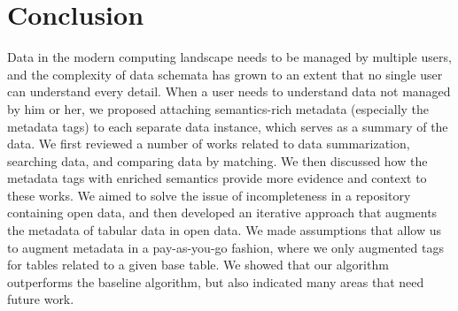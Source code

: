 
\chapter{Conclusion}
\label{ch:Conclusion}

Data in the modern computing landscape needs to be managed by multiple users, and the complexity of data schemata has grown to an extent that no single user can understand every detail. When a user needs to understand data not managed by him or her, we proposed attaching semantics-rich metadata (especially the metadata tags) to each separate data instance, which serves as a summary of the data. We first reviewed a number of works related to data summarization, searching data, and comparing data by matching. We then discussed how the metadata tags with enriched semantics provide more evidence and context to these works. We aimed to solve the issue of incompleteness in a repository containing open data, and then developed an iterative approach that augments the metadata of tabular data in open data. We made assumptions that allow us to augment metadata in a pay-as-you-go fashion, where we only augmented tags for tables related to a given base table. We showed that our algorithm outperforms the baseline algorithm, but also indicated many areas that need future work.

\endinput